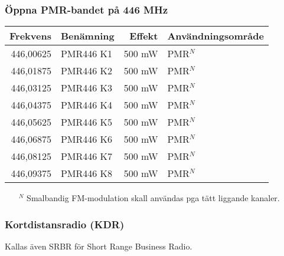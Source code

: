 \subsubsection{Öppna PMR-bandet på 446 MHz}
\begin{longtable}{rlrl}
\textbf{Frekvens} & \textbf{Benämning} & \textbf{Effekt} & \textbf{Användningsområde} \\ \hline \endhead
446,00625         & PMR446 K1          & 500 mW          & PMR$^N$                    \\
446,01875         & PMR446 K2          & 500 mW          & PMR$^N$                    \\
446,03125         & PMR446 K3          & 500 mW          & PMR$^N$                    \\
446,04375         & PMR446 K4          & 500 mW          & PMR$^N$                    \\
446,05625         & PMR446 K5          & 500 mW          & PMR$^N$                    \\
446,06875         & PMR446 K6          & 500 mW          & PMR$^N$                    \\
446,08125         & PMR446 K7          & 500 mW          & PMR$^N$                    \\
446,09375         & PMR446 K8          & 500 mW          & PMR$^N$
\end{longtable}

\footnotesize
\begin{itemize}
	\item[$^N$] Smalbandig FM-modulation skall användas pga tätt liggande kanaler.
\end{itemize}
\normalsize

\subsubsection{Kortdistansradio (KDR)}

Kallas även SRBR för Short Range Business Radio.

